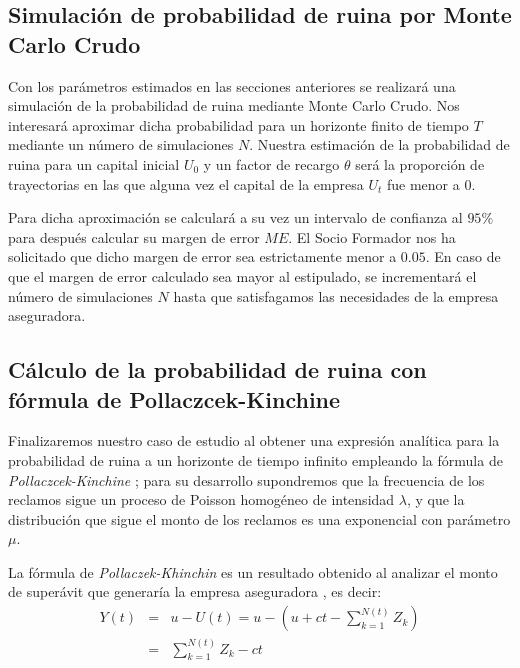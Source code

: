 \documentclass[journal]{IEEEtran}
\begin{document}
        \subsection{Simulación de probabilidad de ruina por Monte Carlo Crudo}

            Con los parámetros estimados en las secciones anteriores se realizará una simulación de la probabilidad de ruina mediante Monte Carlo Crudo. Nos interesará aproximar dicha probabilidad para un horizonte finito de tiempo $T$ mediante un número de simulaciones $N$. Nuestra estimación de la probabilidad de ruina para un capital inicial $U_0$ y un factor de recargo $\theta$ será la proporción de trayectorias en las que alguna vez el capital de la empresa $U_t$ fue menor a 0.

            Para dicha aproximación se calculará a su vez un intervalo de confianza al $95\%$ para después calcular su margen de error $ME$. El Socio Formador nos ha solicitado que dicho margen de error sea estrictamente menor a $0.05$. En caso de que el margen de error calculado sea mayor al estipulado, se incrementará el número de simulaciones $N$ hasta que satisfagamos las necesidades de la empresa aseguradora.

        \subsection{Cálculo de la probabilidad de ruina con fórmula de Pollaczcek-Kinchine} \label{sec:pollaczcek}

            Finalizaremos nuestro caso de estudio al obtener una expresión analítica para la probabilidad de ruina a un horizonte de tiempo infinito empleando la fórmula de \emph{Pollaczcek-Kinchine} \cite{josafat-santana-2020}; para su desarrollo supondremos que la frecuencia de los reclamos sigue un proceso de Poisson homogéneo de intensidad $\lambda$, y que la distribución que sigue el monto de los reclamos es una exponencial con parámetro $\mu$.

            La fórmula de \emph{Pollaczek-Khinchin} es un resultado obtenido al analizar el monto de superávit que generaría la empresa aseguradora \cite{burnecki2005best}, es decir:
            \begin{eqnarray*}
                Y(t) &=& u - U(t) = u-(u+ct-\sum_{k=1}^{N(t)} {Z_k}) \\
                &=& \sum_{k=1}^{N(t)} {Z_k} - ct
            \end{eqnarray*}
\end{document}
